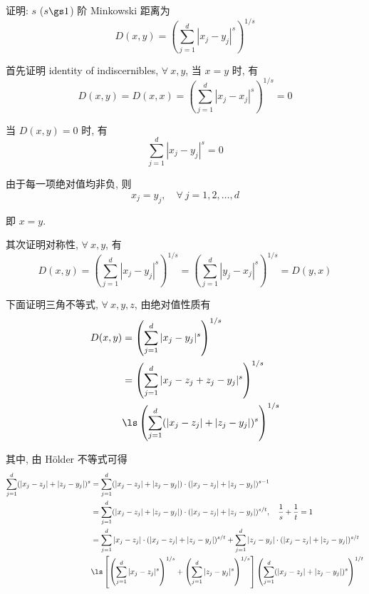 \documentclass[openany]{ctexbook}
\theoremstyle{kaiti}
\theoremstyle{normal}
\begin{document}
证明: $s$ ($s\gs1$) 阶 Minkowski 距离为
\begin{equation}
  D(x,y)=\left(\sum_{j=1}^d|x_j-y_j|^s\right)^{1/s}
\end{equation}

首先证明 identity of indiscernibles, $\forall~x,y$, 当 $x=y$ 时, 有
\begin{equation}
  D(x,y)=D(x,x)=\left(\sum_{j=1}^d|x_j-x_j|^s\right)^{1/s}=0
\end{equation}

当 $D(x,y)=0$ 时, 有
\begin{equation}
  \sum_{j=1}^d|x_j-y_j|^s=0
\end{equation}

由于每一项绝对值均非负, 则
\begin{equation}
  x_j=y_j,\quad\forall~j=1,2,\dots,d
\end{equation}

即 $x=y$.

其次证明对称性, $\forall~x,y$, 有
\begin{equation}
  D(x,y)=\left(\sum_{j=1}^d|x_j-y_j|^s\right)^{1/s}=\left(\sum_{j=1}^d|y_j-x_j|^s\right)^{1/s}=D(y,x)
\end{equation}

下面证明三角不等式, $\forall~x,y,z$, 由绝对值性质有
\begin{equation}
  \begin{aligned}
    D(x,y)
    &=\left(\sum_{j=1}^d|x_j-y_j|^s\right)^{1/s}\\
    &=\left(\sum_{j=1}^d|x_j-z_j+z_j-y_j|^s\right)^{1/s}\\
    &\ls\left(\sum_{j=1}^d(|x_j-z_j|+|z_j-y_j|)^s\right)^{1/s}\\
  \end{aligned}
\end{equation}

其中, 由 H{\"o}lder 不等式可得
\begin{equation}
  \begin{aligned}
    \sum_{j=1}^d(|x_j-z_j|+|z_j-y_j|)^s
    &=\sum_{j=1}^d(|x_j-z_j|+|z_j-y_j|)\cdot(|x_j-z_j|+|z_j-y_j|)^{s-1}\\
    &=\sum_{j=1}^d(|x_j-z_j|+|z_j-y_j|)\cdot(|x_j-z_j|+|z_j-y_j|)^{s/t},\quad \frac{1}{s}+\frac{1}{t}=1\\
    &=\sum_{j=1}^d|x_j-z_j|\cdot(|x_j-z_j|+|z_j-y_j|)^{s/t}+\sum_{j=1}^d|z_j-y_j|\cdot(|x_j-z_j|+|z_j-y_j|)^{s/t}\\
    &\ls\left[\left(\sum_{j=1}^d|x_j-z_j|^s\right)^{1/s}+\left(\sum_{j=1}^d|z_j-y_j|^s\right)^{1/s}\right]\left(\sum_{j=1}^d(|x_j-z_j|+|z_j-y_j|)^{s}\right)^{1/t}\\
  \end{aligned}
\end{equation}
\end{document}
